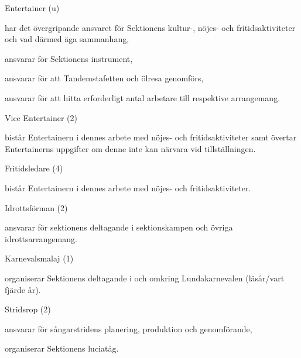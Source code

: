 \documentclass[10pt]{article}
\begin{document}
\begin{emptylist}
    \item Entertainer (u)
        \begin{dashlist}
            \item har det övergripande ansvaret för Sektionens kultur-,
                nöjes- och fritidsaktiviteter och vad därmed äga sammanhang,
            \item ansvarar för Sektionens instrument,
            \item ansvarar för att Tandemstafetten och ölresa
                genomförs,
            \item ansvarar för att hitta erforderligt antal arbetare till
                respektive arrangemang.
        \end{dashlist}
    \item Vice Entertainer (2)
        \begin{dashlist}
            \item bistår Entertainern i dennes arbete med nöjes- och
                fritidsaktiviteter samt övertar Entertainerns uppgifter
                om denne inte kan närvara vid tillställningen.
        \end{dashlist}
    \item Fritidsledare (4)
        \begin{dashlist}
            \item bistår Entertainern i dennes arbete med nöjes- och
                fritidsaktiviteter.
        \end{dashlist}
    \item Idrottsförman (2)
        \begin{dashlist}
            \item ansvarar för sektionens deltagande i sektionskampen och
                övriga idrottsarrangemang.
        \end{dashlist}
    \item Karnevalsmalaj (1)
        \begin{dashlist}
            \item organiserar Sektionens deltagande i och omkring
                Lundakarnevalen (läsår/vart fjärde år).
        \end{dashlist}
    \item Stridsrop (2)
        \begin{dashlist}
            \item ansvarar för sångarstridens planering, produktion och
                genomförande,
            \item organiserar Sektionens luciatåg.

\end{dashlist}
\end{emptylist}
\end{document}
